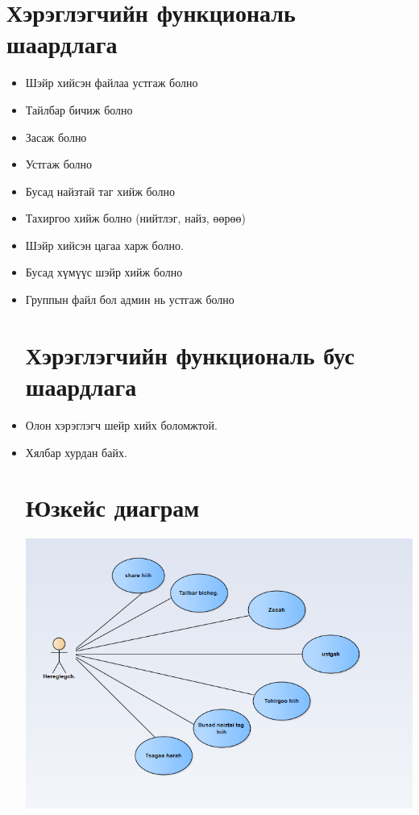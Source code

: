 \documentclass[12pt]{article}
\begin{document}
	\section{Хэрэглэгчийн функциональ шаардлага} 
	\begin{itemize}		 
	\item Шэйр хийсэн файлаа устгаж болно
	\item Тайлбар бичиж болно
	\item Засаж болно
	\item Устгаж болно
	\item Бусад найзтай таг хийж болно
	\item Тахиргоо хийж болно (нийтлэг, найз, өөрөө)
	\item  Шэйр хийсэн цагаа харж болно.
	\item Бусад хүмүүс шэйр хийж болно  
	\item Группын файл бол админ нь устгаж болно
\section{Хэрэглэгчийн функциональ бус шаардлага}
	\item Олон хэрэглэгч шейр хийх боломжтой. 
	\item Хялбар хурдан байх.

	\section{Юзкейс диаграм}
\includegraphics[scale=0.80]{image/usecase.PNG}

\end{itemize}
\end{document}
